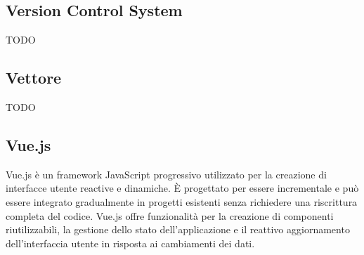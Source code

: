 \vspace{2em}
\subsection*{Version Control System}
TODO

\vspace{2em}
\subsection*{Vettore}
TODO

\vspace{2em}
\subsection*{Vue.js}
Vue.js è un framework JavaScript progressivo utilizzato per la creazione di interfacce utente reactive e dinamiche. È progettato per essere incrementale e può essere integrato gradualmente in progetti esistenti senza richiedere una riscrittura completa del codice. Vue.js offre funzionalità per la creazione di componenti riutilizzabili, la gestione dello stato dell'applicazione e il reattivo aggiornamento dell'interfaccia utente in risposta ai cambiamenti dei dati.
